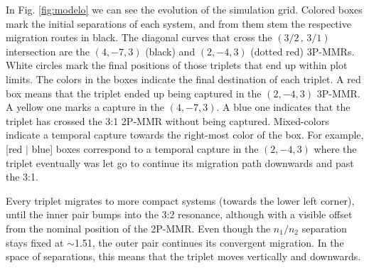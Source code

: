 \documentclass[baaa]{baaa}
\begin{document}
In Fig. \ref{fig:modelo} we can see the evolution of the simulation grid.
Colored boxes mark the initial separations of each system, and from them stem the respective migration routes in black.
The diagonal curves that cross the $(3/2\,,\,3/1)$ intersection are the $(4,-7,3)$ (black) and $(2,-4,3)$ (dotted red) 3P-MMRs.
White circles mark the final positions of those triplets that end up within plot limits.
The colors in the boxes indicate the final destination of each triplet.
A red box means that the triplet ended up being captured in the $(2,-4,3)$ 3P-MMR.
A yellow one marks a capture in the $(4,-7,3)$.
A blue one indicates that the triplet has crossed the 3:1 2P-MMR without being captured.
Mixed-colors indicate a temporal capture towards the right-most color of the box.
For example, [red $|$ blue] boxes correspond to a temporal capture in the $(2,-4,3)$ where the triplet eventually was let go to continue its migration path downwards and past the 3:1.


Every triplet migrates to more compact systems (towards the lower left corner), until the inner pair bumps into the 3:2 resonance, although with a visible offset from the nominal position of the 2P-MMR.
Even though the $n_1/n_2$ separation stays fixed at $\sim$1.51, the outer pair continues its convergent migration.
In the space of separations, this means that the triplet moves vertically and downwards.

\end{document}
